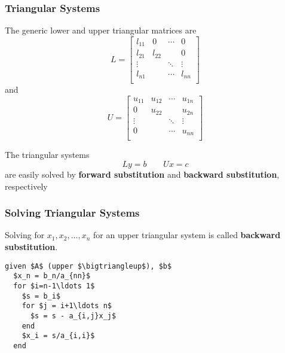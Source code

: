 \documentclass[10pt]{beamer}
\begin{document}
\begin{frame}
\frametitle{Triangular Systems}

The generic lower and upper triangular matrices are
\begin{equation*}
    L = \begin{bmatrix} l_{11} &   0    & \cdots &   0    \\
                        l_{21} & l_{22} &        &   0    \\
                        \vdots &        & \ddots & \vdots \\
                        l_{n1} &        & \cdots & l_{nn} \\
        \end{bmatrix}
\end{equation*}
and
\begin{equation*}
    U = \begin{bmatrix} u_{11} & u_{12} & \cdots & u_{1n} \\
                           0   & u_{22} &        & u_{2n}  \\
                        \vdots &        & \ddots & \vdots \\
                           0   &        & \cdots & u_{nn} \\
        \end{bmatrix}
\end{equation*}

The triangular systems
\begin{equation*}
    Ly = b \ \ \ \ \ \ \ \ \ Ux = c
\end{equation*}
are easily solved by \textbf{forward substitution} and
\textbf{backward substitution}, respectively

\end{frame}
\begin{frame}[fragile]
\frametitle{Solving Triangular Systems}

Solving for $x_1, x_2, \ldots, x_n$
for an upper triangular system is called \textbf{backward substitution}.
\begin{lstlisting}[mathescape,caption=backward substitution (page 270),label=algo:backsub]
  given $A$ (upper $\bigtriangleup$), $b$               
  $x_n = b_n/a_{nn}$           
  for $i=n-1\ldots 1$          
    $s = b_i$                  
    for $j = i+1\ldots n$    
      $s = s - a_{i,j}x_j$   
    end                      
    $x_i = s/a_{i,i}$          
  end                          
\end{lstlisting}


\end{frame}
\end{document}
